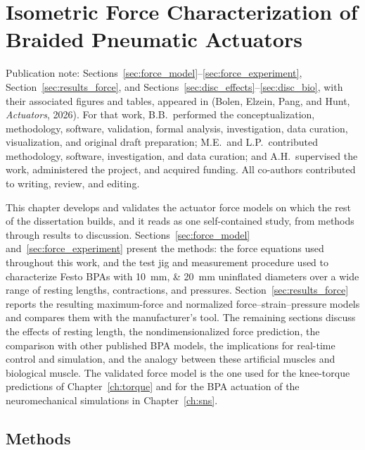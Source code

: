 \chapter{Isometric Force Characterization of Braided Pneumatic Actuators}\label{ch:muscles}\label{ch:methods}\label{ch:discussion}
\graphicspath{{../Figures/20-muscles/}{figs/20-muscles/}}

{\doublespacing\normalsize\upshape
\noindent Publication note: Sections~\ref{sec:force_model}--\ref{sec:force_experiment}, Section~\ref{sec:results_force}, and Sections~\ref{sec:disc_effects}--\ref{sec:disc_bio}, with their associated figures and tables, appeared in \citet{bolen_2026} (Bolen, Elzein, Pang, and Hunt, \emph{Actuators}, 2026). For that work, B.B.\ performed the conceptualization, methodology, software, validation, formal analysis, investigation, data curation, visualization, and original draft preparation; M.E.\ and L.P.\ contributed methodology, software, investigation, and data curation; and A.H.\ supervised the work, administered the project, and acquired funding. All co-authors contributed to writing, review, and editing.\par}

This chapter develops and validates the actuator force models on which the rest of the dissertation builds, and it reads as one self-contained study, from methods through results to discussion. Sections~\ref{sec:force_model} and~\ref{sec:force_experiment} present the methods: the force equations used throughout this work, and the test jig and measurement procedure used to characterize Festo BPAs with \qtylist{10;20}{\mm} uninflated diameters over a wide range of resting lengths, contractions, and pressures. Section~\ref{sec:results_force} reports the resulting maximum-force and normalized force--strain--pressure models and compares them with the manufacturer's tool. The remaining sections discuss the effects of resting length, the nondimensionalized force prediction, the comparison with other published BPA models, the implications for real-time control and simulation, and the analogy between these artificial muscles and biological muscle. The validated force model is the one used for the knee-torque predictions of Chapter~\ref{ch:torque} and for the BPA actuation of the neuromechanical simulations in Chapter~\ref{ch:sns}.

\section{Methods}


